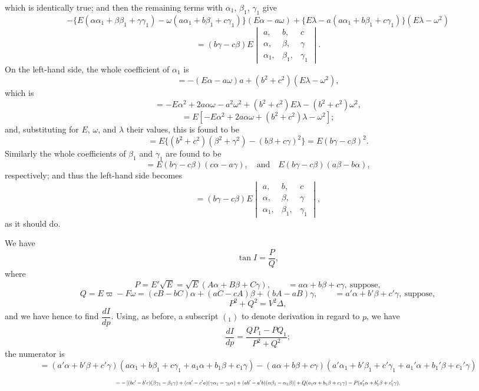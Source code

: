 \documentclass[11pt]{article}
\begin{document}
which is identically true; and then the remaining terms with $\alpha_1$, $\beta_1$, $\gamma_1$ give
\[
-\{E(\alpha\alpha_1+\beta\beta_1+\gamma\gamma_1) - \omega(a\alpha_1+b\beta_1+c\gamma_1)\}(E\alpha-a\omega) + \{E\lambda - a(a\alpha_1+b\beta_1+c\gamma_1)\}(E\lambda-\omega^2)
\]
\[
= (b\gamma-c\beta)E
\begin{vmatrix} a, & b, & c \\ \alpha, & \beta, & \gamma \\ \alpha_1, & \beta_1, & \gamma_1 \end{vmatrix}.
\]
On the left-hand side, the whole coefficient of $\alpha_1$ is
\[
= -(E\alpha-a\omega)a + (b^2+c^2)(E\lambda-\omega^2),
\]
which is
\[
= -E\alpha^2 + 2a\alpha\omega - a^2\omega^2 + (b^2+c^2)E\lambda - (b^2+c^2)\omega^2,
\]
\[
= E[-E\alpha^2 + 2a\alpha\omega + (b^2+c^2)\lambda - \omega^2];
\]
and, substituting for $E$, $\omega$, and $\lambda$ their values, this is found to be
\[
= E\{(b^2+c^2)(\beta^2+\gamma^2) - (b\beta+c\gamma)^2\} = E(b\gamma-c\beta)^2.
\]
Similarly the whole coefficients of $\beta_1$ and $\gamma_1$ are found to be
\[
= E(b\gamma-c\beta)(c\alpha-a\gamma),\quad \text{and}\quad E(b\gamma-c\beta)(a\beta-b\alpha),
\]
respectively; and thus the left-hand side becomes
\[
= (b\gamma-c\beta)E
\begin{vmatrix} a, & b, & c \\ \alpha, & \beta, & \gamma \\ \alpha_1, & \beta_1, & \gamma_1 \end{vmatrix},
\]
as it should do.

We have
\[
\tan I = \frac{P}{Q},
\]
where
\[
P = E'\sqrt{E} = \sqrt{E}(A\alpha+B\beta+C\gamma),\qquad = a\alpha+b\beta+c\gamma,\ \text{suppose},
\]
\[
Q = E\varpi-F\omega = (cB-bC)\alpha + (aC-cA)\beta + (bA-aB)\gamma,\qquad = a'\alpha+b'\beta+c'\gamma,\ \text{suppose},
\]
\[
P^2+Q^2 = V^2\Delta,
\]
and we have hence to find $\dfrac{dI}{dp}$. Using, as before, a subscript $({}_1)$ to denote derivation in regard to $p$, we have
\[
\frac{dI}{dp} = \frac{QP_1 - PQ_1}{P^2+Q^2};
\]
the numerator is
\[
= (a'\alpha+b'\beta+c'\gamma)(a\alpha_1+b\beta_1+c\gamma_1+a_1\alpha+b_1\beta+c_1\gamma) - (a\alpha+b\beta+c\gamma)(a'\alpha_1+b'\beta_1+c'\gamma_1+a_1'\alpha+b_1'\beta+c_1'\gamma)
\]
\[ \resizebox{\textwidth}{!}{$\displaystyle
= -\,[(bc'-b'c)(\beta\gamma_1-\beta_1\gamma) + (ca'-c'a)(\gamma\alpha_1-\gamma_1\alpha) + (ab'-a'b)(\alpha\beta_1-\alpha_1\beta)]
+ Q(a_1\alpha+b_1\beta+c_1\gamma) - P(a_1'\alpha+b_1'\beta+c_1'\gamma).
$} \]
\end{document}
